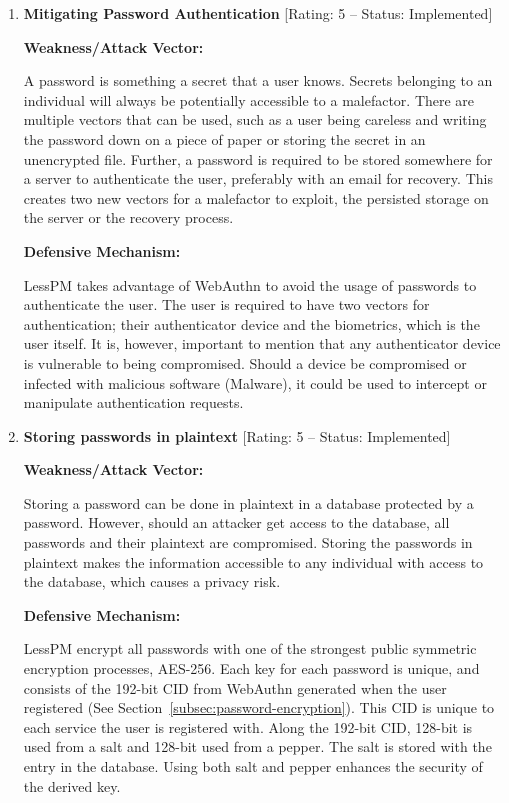 \begin{enumerate}[label=$\blacktriangleright$]
  \item \textbf{Mitigating Password Authentication} [Rating: 5 -- Status:
  Implemented]

  \textbf{Weakness/Attack Vector:}

  A password is something a secret that a user knows.
  Secrets belonging to an individual will always be potentially accessible to
  a malefactor.
  There are multiple vectors that can be used, such as a user being careless
  and writing the password down on a piece of paper or storing the secret in an
  unencrypted file.
  Further, a password is required to be stored somewhere for a server to
  authenticate the user, preferably with an email for recovery.
  This creates two new vectors for a malefactor to exploit, the persisted
  storage on the server or the recovery process.

  \textbf{Defensive Mechanism:}

  LessPM takes advantage of WebAuthn to avoid the usage of passwords to
  authenticate the user.
  The user is required to have two vectors for authentication; their
  authenticator device and the biometrics, which is the user itself.
  It is, however, important to mention that any authenticator device is
  vulnerable to being compromised.
  Should a device be compromised or infected with malicious software (Malware),
  it could be used to intercept or manipulate authentication requests.

  \item \textbf{Storing passwords in plaintext}
  [Rating: 5 -- Status: Implemented]

  \textbf{Weakness/Attack Vector:}

  Storing a password can be done in plaintext in a database protected by a
  password.
  However, should an attacker get access to the database, all passwords and
  their plaintext are compromised.
  Storing the passwords in plaintext makes the information accessible to any
  individual with access to the database, which causes a privacy risk.

  \textbf{Defensive Mechanism:}

  LessPM encrypt all passwords with one of the strongest public symmetric
  encryption processes, AES-256.
  Each key for each password is unique, and consists of the 192-bit CID from
  WebAuthn generated when the user registered (See
  Section~\ref{subsec:password-encryption}).
  This CID is unique to each service the user is registered with.
  Along the 192-bit CID, 128-bit is used from a salt and 128-bit used from a
  pepper.
  The salt is stored with the entry in the database.
  Using both salt and pepper enhances the security of the derived key.


\end{enumerate}
